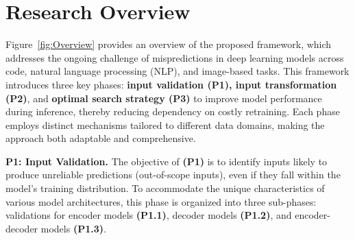 \section{Research Overview}

Figure~\ref{fig:Overview} provides an overview of the proposed framework, which addresses the ongoing challenge of mispredictions in deep learning models across code, natural language processing (NLP), and image-based tasks. This framework introduces three key phases: \textbf{input validation (P1), input transformation (P2)}, and \textbf{optimal search strategy (P3)} to improve model performance during inference, thereby reducing dependency on costly retraining. Each phase employs distinct mechanisms tailored to different data domains, making the approach both adaptable and comprehensive.


\textbf{P1: Input Validation.} The objective of \textbf{(P1)} is to identify inputs likely to produce unreliable predictions (out-of-scope inputs), even if they fall within the model's training distribution. To accommodate the unique characteristics of various model architectures, this phase is organized into three sub-phases: validations for encoder models \textbf{(P1.1)}, decoder models \textbf{(P1.2)}, and encoder-decoder models \textbf{(P1.3)}.


